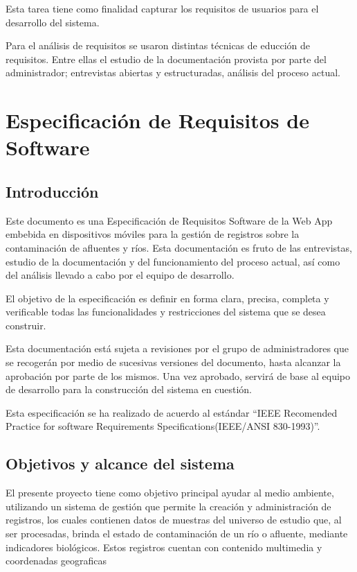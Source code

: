   Esta tarea tiene como finalidad capturar los requisitos de usuarios para el desarrollo del sistema.
  
  Para el análisis de requisitos se usaron distintas técnicas de educción de requisitos. Entre ellas el estudio de la documentación provista por parte del administrador; entrevistas abiertas y estructuradas, análisis del proceso actual.

\section{Especificación de Requisitos de Software}

\renewcommand{\thesubsection}{\arabic{subsection}}
 \subsection{Introducción}
 
 Este documento es una Especificación de Requisitos Software de la  Web App embebida en dispositivos móviles para la gestión de registros sobre la contaminación de afluentes y ríos. Esta documentación es fruto de las entrevistas, estudio de la documentación y del funcionamiento del proceso actual, así como del análisis llevado a cabo por el equipo de desarrollo.

El objetivo de la especificación es definir en forma clara, precisa, completa y verificable todas las funcionalidades y restricciones del sistema que se desea construir.

Esta documentación está sujeta a revisiones por el grupo de administradores que se recogerán por medio de sucesivas versiones del documento, hasta alcanzar la aprobación por parte de los mismos. Una vez aprobado, servirá de base al equipo de desarrollo para la construcción del sistema en cuestión.

Esta especificación se ha realizado de acuerdo al estándar “IEEE Recomended Practice for software Requirements Specifications(IEEE/ANSI 830-1993)”.


    \subsection{Objetivos y alcance del sistema}

    El presente proyecto tiene como objetivo principal ayudar al medio ambiente, utilizando un sistema de gestión que permite la creación y administración de registros, los cuales contienen datos de muestras del universo de estudio que, al ser procesadas, brinda el estado de contaminación de un río o afluente, mediante indicadores biológicos.
    Estos registros cuentan con contenido multimedia y coordenadas geograficas

